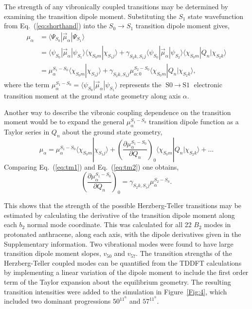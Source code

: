 \documentclass[journal=jpcafh,manuscript=article,layout=onecolumn, 12pt]{achemso}
\begin{document}
The strength of any vibronically coupled transitions may be determined by examining the
transition dipole moment. Substituting the $S_1$ state wavefunction from Eq.~(\ref{eq:shorthand}) into the $S_0\rightarrow S_1$ transition dipole moment gives,
\begin{align}
\mu_{\alpha}&=\langle\Psi_{S_0}|\vec{\mu}_{\alpha}|\Psi_{S_1}\rangle\\
&=\langle\psi_{S_0}|\vec{\mu}_{\alpha}|\psi_{S_1}\rangle\langle\chi_{S_0m}|\chi_{S_1j}\rangle +
\gamma_{S_2k,S_1j}\langle\psi_{S_0}|\vec{\mu}_{\alpha}|\psi_{S_2}\rangle\langle\chi_{S_0m}|Q_n|\chi_{S_2k}\rangle\\
&=\mu_{\alpha}^{S_1-S_0}\langle\chi_{S_0m}|\chi_{S_1j}\rangle + \gamma_{S_2k,S_1j}\mu_{\alpha:0}^{S_2-S_0}\langle\chi_{S_0m}|Q_n|\chi_{S_2k}\rangle,
\label{eq:tm1}
\end{align}
where the term $\mu_{\alpha}^{S_1-S_0}= \langle\psi_{S_0}|\vec{\mu}_{\alpha}|\psi_{S_1}\rangle$ represents the $\text{S0}~\rightarrow~\text{S1}$ electronic transition moment at the ground state geometry along axis $\alpha$.

Another way to describe the vibronic coupling dependence on the transition moment would be to expand the general $\mu_{\alpha}^{S_1-S_0}$ transition dipole function as a Taylor series in $Q_n$ about the ground state geometry,
\begin{equation}
\mu_{\alpha} = \mu_{\alpha}^{S_1-S_0}\langle\chi_{S_0m}|\chi_{S_1j}\rangle + \left(\frac{\partial\mu_{\alpha}^{S_1-S_0}}{\partial Q_n}\right)_0 \langle\chi_{S_0m}|Q_n|\chi_{S_2k}\rangle + \dots 
\label{eq:tm2}
\end{equation} 
Comparing Eq.~(\ref{eq:tm1}) and Eq.~(\ref{eq:tm2}) one obtains,
\begin{equation}
\left(\frac{\partial\mu_{\alpha}^{S_1-S_0}}{\partial Q_n}\right)_0 = \gamma_{S_2k,S_1j}\mu_{\alpha}^{S_2-S_0}.
\label{eq:tm3}
\end{equation}

This shows that the strength of the possible Herzberg-Teller transitions may be estimated by calculating the derivative of the transition dipole moment along each $b_2$ normal mode coordinate. This was calculated for all 22 $B_2$ modes in protonated anthracene, along each axis, with the dipole derivatives given in the Supplementary information. Two vibrational modes were found to have large transition dipole moment slopes, $v_{50}$ and $v_{57}$. The transition strengths of the Herzberg-Teller coupled modes can be quantified from the TDDFT calculations by implementing a linear variation of the dipole moment to include the first order term of the Taylor expansion about the equilibrium geometry. The resulting transition intensities were added to the simulation in Figure~\ref{Fig:4}, which included two dominant progressions $50^11^n$ and $57^11^n$. 
\end{document}
